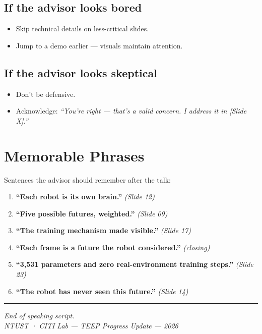\documentclass[11pt,a4paper]{article}
\begin{document}
\subsection*{If the advisor looks bored}
\begin{itemize}[leftmargin=1.4em, itemsep=0.2em]
\item Skip technical details on less-critical slides.
\item Jump to a demo earlier — visuals maintain attention.
\end{itemize}

\subsection*{If the advisor looks skeptical}
\begin{itemize}[leftmargin=1.4em, itemsep=0.2em]
\item Don't be defensive.
\item Acknowledge: \textit{``You're right — that's a valid concern. I address it in [Slide X].''}
\end{itemize}

\section{Memorable Phrases}

Sentences the advisor should remember after the talk:

\begin{enumerate}[leftmargin=1.4em, itemsep=0.3em]
\item \textcolor{thAmber}{\textbf{``Each robot is its own brain.''}} \hfill \textit{(Slide 12)}
\item \textcolor{thAmber}{\textbf{``Five possible futures, weighted.''}} \hfill \textit{(Slide 09)}
\item \textcolor{thAmber}{\textbf{``The training mechanism made visible.''}} \hfill \textit{(Slide 17)}
\item \textcolor{thAmber}{\textbf{``Each frame is a future the robot considered.''}} \hfill \textit{(closing)}
\item \textcolor{thAmber}{\textbf{``3,531 parameters and zero real-environment training steps.''}} \hfill \textit{(Slide 23)}
\item \textcolor{thAmber}{\textbf{``The robot has never seen this future.''}} \hfill \textit{(Slide 14)}
\end{enumerate}

\bigskip
\hrule
\bigskip

\begin{center}
\small\itshape\color{thMuted}
End of speaking script.\\
NTUST · CITI Lab — TEEP Progress Update — 2026
\end{center}
\end{document}
